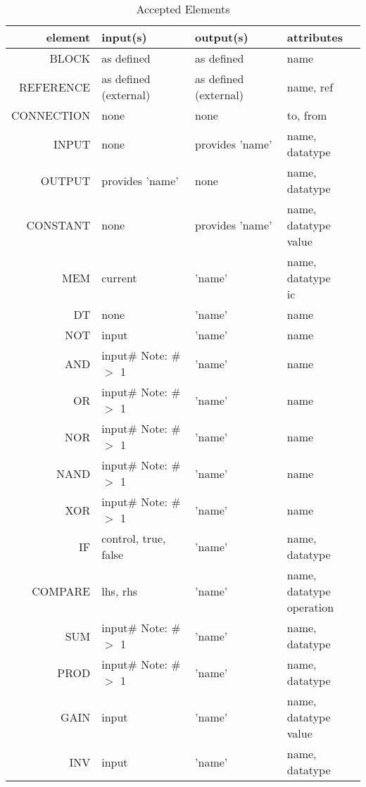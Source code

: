 \begin{longtable}[c]{ |r|l|l|l| } 
    \caption{Accepted Elements}
    \label{table:elem}
    \hline
    element & input(s) & output(s) & attributes \\ 
    \hline
    \hline
    BLOCK & as defined & as defined & name \\ 
    \hline
    REFERENCE & as defined (external) & as defined (external) & name, ref \\ 
    \hline
    CONNECTION & none & none & to, from \\
    \hline
    INPUT & none & provides 'name' & name, datatype \\ 
    \hline
    OUTPUT & provides 'name' & none & name, datatype \\ 
    \hline
    CONSTANT & none & provides 'name' & \specialcell{name, datatype \\ value} \\ 
    \hline
    \hline
    MEM & current & 'name' & \specialcell{name, datatype \\ ic} \\
    \hline
    DT & none & 'name' & name \\
    \hline
    NOT & input & 'name' & name \\
    \hline
    AND & \specialcell{input\# \\ Note: \# $>$ 1} & 'name' & name \\
    \hline
    OR & \specialcell{input\# \\ Note: \# $>$ 1} & 'name' & name \\
    \hline
    NOR & \specialcell{input\# \\ Note: \# $>$ 1} & 'name' & name \\
    \hline
    NAND & \specialcell{input\# \\ Note: \# $>$ 1} & 'name' & name \\
    \hline
    XOR & \specialcell{input\# \\ Note: \# $>$ 1} & 'name' & name \\
    \hline
    IF & control, true, false & 'name' & name, datatype \\
    \hline
    COMPARE & lhs, rhs  & 'name' & \specialcell{name, datatype \\ operation} \\
    \hline
    SUM & \specialcell{input\# \\ Note: \# $>$ 1} & 'name' & name, datatype \\
    \hline
    PROD & \specialcell{input\# \\ Note: \# $>$ 1} & 'name' & name, datatype \\
    \hline
    GAIN & input & 'name' & \specialcell{name, datatype \\ value} \\
    \hline
    INV & input & 'name' & name, datatype \\
    \hline
\end{longtable}


